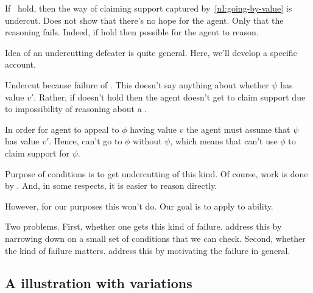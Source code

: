 \begin{note}
  If~\nIBackground{} hold, then the way of claiming support captured by~\ref{nI:going-by-value} is undercut.
  Does not show that there's no hope for the agent.
  Only that the reasoning fails.
  Indeed, if \nIBackground{} hold then possible for the agent to reason.
\end{note}

\begin{note}[\eiS{}]
  Idea of an undercutting defeater is quite general.
  Here, we'll develop a specific account.

  Undercut because failure of \eiS{}.
  This doesn't say anything about whether \(\psi\) has value \(v'\).
  Rather, if \eiS{} doesn't hold then the agent doesn't get to claim support {\color{red} due to impossibility of reasoning about a \requ{}}.

  In order for agent to appeal to \(\phi\) having value \(v\) the agent must assume that \(\psi\) has value \(v'\).
  Hence, can't go to \(\phi\) without \(\psi\), which means that can't use \(\phi\) to claim support for \(\psi\).
\end{note}

\begin{note}
  Purpose of conditions is to get undercutting of this kind.
  Of course, work is done by \eiS{}.
  And, in some respects, it is easier to reason directly.

  However, for our purposes this won't do.
  Our goal is to apply \nI{} to ability.

  Two problems.
  First, whether one gets this kind of failure.
  \nI{} address this by narrowing down on a small set of conditions that we can check.
  Second, whether the kind of failure matters.
  \nI{} address this by motivating the failure in general.
\end{note}



\subsection{A illustration with variations}


